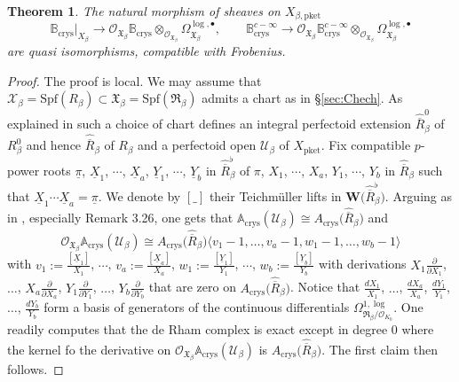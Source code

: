 \documentclass[asterisque,english]{smfart}
\newtheorem{theorem}{Theorem}[]
\begin{document}
\begin{theorem}\label{thm:OBcrys}
 The natural morphism of sheaves  on $X_{\beta,\mathrm{pket}}$ $$ \mathbb{B}_{\mathrm{crys}}\vert_{X_\beta} \longrightarrow{\mathcal{O}}_{\mathfrak{X}_\beta}\mathbb{B}_{\mathrm{crys}}\otimes_{\mathcal{O}_{\mathfrak{X}_\beta}} \Omega_{\mathfrak{X}_\beta}^{\log,\bullet} ,\qquad \mathbb{B}_{\mathrm{crys}}^{c-\infty} \longrightarrow{\mathcal{O}}_{\mathfrak{X}_\beta}\mathbb{B}_{\mathrm{crys}}^{c-\infty}\otimes_{\mathcal{O}_{\mathfrak{X}_\beta}} \Omega_{\mathfrak{X}_\beta}^{\log,\bullet}$$are quasi isomorphisms, compatible with Frobenius. 


\end{theorem}
\begin{proof}  The proof is local.  We may assume that $\mathcal{X}_\beta=\mathrm{Spf}(R_\beta)\subset  \mathfrak{X}_\beta=\mathrm{Spf}(\mathfrak{R}_\beta)$ admits a chart as in \S \ref{sec:Chech}.  As explained in \cite[\S 3.1.2]{AI}  such a choice of chart defines an integral perfectoid extension $\widehat{\overline{R}}^0_\beta$ of $R^0_\beta$ and hence $\widehat{\overline{R}}_\beta$ of $R_\beta$ and a perfectoid open $\mathcal{U}_\beta$ of $X_{\mathrm{pket}}$.  Fix compatible $p$-power roots $\underline{\pi}$, $\underline{X}_1$, $\cdots$, $\underline{X}_a$, $\underline{Y}_1$, $\cdots$, $\underline{Y}_b$ in $\widehat{\overline{R}}^\flat_\beta$ of $\pi$, $X_1$, $\cdots$, $X_a$, $Y_1$, $\cdots$, $Y_b$ in $\widehat{\overline{R}}_\beta$ such that $\underline{X}_1\cdots \underline{X}_a=\underline{\pi}$.
We denote by $[\_]$ their Teichm\"uller lifts in $\mathbf{W}\bigl(\widehat{\overline{R}}^\flat_\beta)$. 
Arguing as in \cite[\S 3.4]{AI}, especially Remark 3.26, one gets that $\mathbb{A}_{\mathrm{crys}}(\mathcal{U}_\beta)\cong A_{\mathrm{crys}}\bigl(\widehat{\overline{R}}_\beta\bigr)$ and $$\mathcal{O}_{\mathfrak{X}_\beta}\mathbb{A}_{\mathrm{crys}}(\mathcal{U}_\beta)\cong A_{\mathrm{crys}}\bigl(\widehat{\overline{R}}_\beta\bigr)\langle v_1-1, \ldots, v_a-1,w_1-1,\ldots,w_b-1\rangle$$with  $v_1:=\frac{[\underline{X}_1]}{X_1}$, $\cdots$, $v_a:=\frac{[\underline{X}_a]}{X_a}$, $w_1:=\frac{[\underline{Y}_1]}{Y_1}$, $\cdots$, $w_b:=\frac{[\underline{Y}_b]}{Y_b}$ with derivations   $X_1 \frac{\partial}{\partial X_1}$, $\ldots$, $X_a \frac{\partial}{\partial X_a}$, $Y_1 \frac{\partial}{\partial Y_1}$, $\ldots$, $Y_b \frac{\partial}{\partial Y_b}$ that are zero on $A_{\mathrm{crys}}\bigl(\widehat{\overline{R}}_\beta\bigr)$. Notice that $ \frac{d X_1}{X_1}$, $\ldots$, $ \frac{d X_a}{X_a}$, $ \frac{d Y_1}{Y_1}$, $\ldots$, $ \frac{d Y_b}{Y_b}$  form a basis of generators of the continuous differentials $\Omega^{1,\log}_{\mathfrak{R}_\beta/\mathcal{O}_{K_0}}$. One readily computes that the de Rham complex is exact except in degree $0$ where the kernel fo the derivative on $\mathcal{O}_{\mathfrak{X}_\beta}\mathbb{A}_{\mathrm{crys}}(\mathcal{U}_\beta)$ is $A_{\mathrm{crys}}\bigl(\widehat{\overline{R}}_\beta\bigr)$. The first claim then follows. 


\end{proof}
\end{document}
